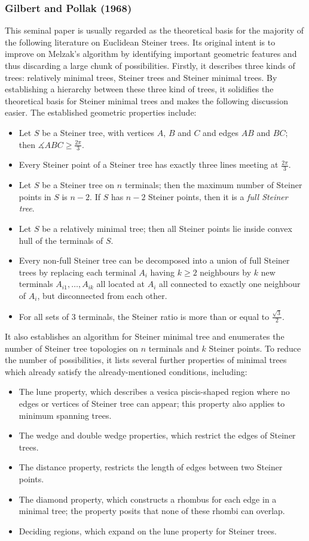 \documentclass{mpaper}
\begin{document}
\subsubsection{Gilbert and Pollak (1968) \cite{GP1968}}
This seminal paper is usually regarded as the theoretical basis for the majority of the following literature on Euclidean Steiner trees. Its original intent is to improve on Melzak's algorithm by identifying important geometric features and thus discarding a large chunk of possibilities. Firstly, it describes three kinds of trees: relatively minimal trees, Steiner trees and Steiner minimal trees. By establishing a hierarchy between these three kind of trees, it solidifies the theoretical basis for Steiner minimal trees and makes the following discussion easier. The established geometric properties include:
\begin{itemize}
\item Let $S$ be a Steiner tree, with vertices $A$, $B$ and $C$ and edges $AB$ and $BC$; then $\measuredangle ABC\geq\frac{2\pi}{3}$.
\item Every Steiner point of a Steiner tree has exactly three lines meeting at $\frac{2\pi}{3}$.
\item Let $S$ be a Steiner tree on $n$ terminals; then the maximum number of Steiner points in $S$ is $n-2$. If $S$ has $n-2$ Steiner points, then it is a \emph{full Steiner tree}.
\item Let $S$ be a relatively minimal tree; then all Steiner points lie inside convex hull of the terminals of $S$.
\item Every non-full Steiner tree can be decomposed into a union of full Steiner trees by replacing each terminal $A_i$ having $k\geq 2$ neighbours by $k$ new terminals $A_{i1},\dots,A_{ik}$ all located at $A_i$ all connected to exactly one neighbour of $A_i$, but disconnected from each other.
\item For all sets of 3 terminals, the Steiner ratio is more than or equal to $\frac{\sqrt{3}}{2}$.
\end{itemize}

It also establishes an algorithm for Steiner minimal tree and enumerates the number of Steiner tree topologies on $n$ terminals and $k$ Steiner points. To reduce the number of possibilities, it lists several further properties of minimal trees which already satisfy the already-mentioned conditions, including:
\begin{itemize}
\item The lune property, which describes a vesica piscis-shaped region where no edges or vertices of Steiner tree can appear; this property also applies to minimum spanning trees.
\item The wedge and double wedge properties, which restrict the edges of Steiner trees.
\item The distance property, restricts the length of edges between two Steiner points.
\item The diamond property, which constructs a rhombus for each edge in a minimal tree; the property posits that none of these rhombi can overlap.
\item Deciding regions, which expand on the lune property for Steiner trees.
\end{itemize}
\end{document}
